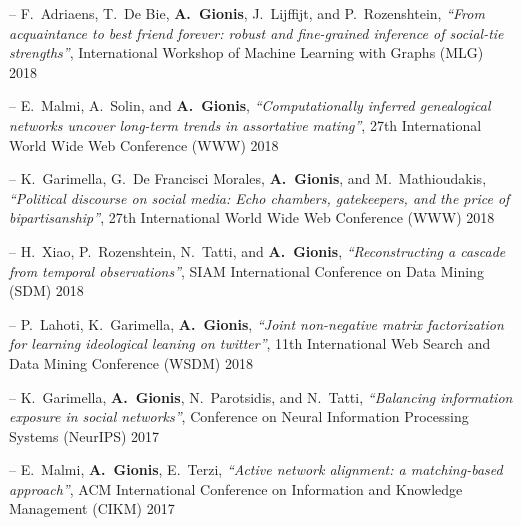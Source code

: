 \documentclass[a4paper,11pt]{article}
\begin{document}

\item[--] 
{F.\ Adriaens, T.\ De Bie, \textbf{A.\ Gionis}, J.\ Lijffijt, and P.\ Rozenshtein}, 
{\em ``From acquaintance to best friend forever: robust and fine-grained inference of social-tie strengths''}, 
International Workshop of Machine Learning with Graphs (MLG) 2018 

\item[--] 
{E.\ Malmi, A.\ Solin, and \textbf{A.\ Gionis}}, 
{\em ``Computationally inferred genealogical networks uncover long-term trends in assortative mating''}, 
27th International World Wide Web Conference (WWW) 2018 

\item[--] 
{K.\ Garimella, G.\ De Francisci Morales, \textbf{A.\ Gionis}, and M.\ Mathioudakis}, 
{\em ``Political discourse on social media: Echo chambers, gatekeepers, and the price of bipartisanship''}, 
27th International World Wide Web Conference (WWW) 2018 

\item[--] 
{H.\ Xiao, P.\ Rozenshtein, N.\ Tatti, and \textbf{A.\ Gionis}}, 
{\em ``Reconstructing a cascade from temporal observations''}, 
SIAM International Conference on Data Mining (SDM) 2018

\item[--] 
{P.\ Lahoti, K.\ Garimella, \textbf{A.\ Gionis}}, 
{\em ``Joint non-negative matrix factorization for learning ideological leaning on twitter''}, 
11th International Web Search and Data Mining Conference (WSDM) 2018

\item[--] 
{K.\ Garimella, \textbf{A.\ Gionis}, N.\ Parotsidis, and N.\ Tatti}, 
{\em ``Balancing information exposure in social networks''}, 
Conference on Neural Information Processing Systems (NeurIPS) 2017

\item[--] 
{E.\ Malmi, \textbf{A.\ Gionis}, E.\ Terzi}, 
{\em ``Active network alignment: a matching-based approach''}, 
ACM International Conference on Information and Knowledge Management (CIKM) 2017
\end{document}

